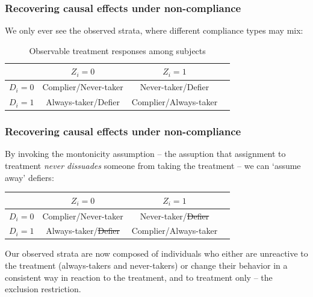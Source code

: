 \documentclass[12pt,english,dvipsnames,aspectratio=169,handout]{beamer}\usepackage[]{graphicx}\usepackage[]{xcolor}
\begin{document}
\begin{frame}
\frametitle{Recovering causal effects under non-compliance}
\footnotesize
We only ever see the observed strata, where different compliance types may mix:

\begin{table}[htbp]\centering\footnotesize
\begin{tabular}{cccc}
\hline
        &         $Z_i=0$         & $Z_i=1$ \\ 
\hline
$D_i=0$ & Complier/Never-taker  & Never-taker/Defier \\
$D_i=1$ & Always-taker/Defier   & Complier/Always-taker  \\
\hline
\end{tabular}
\caption{\scriptsize Observable treatment responses among subjects}
\end{table}
\end{frame}



\begin{frame}
\frametitle{Recovering causal effects under non-compliance}
\footnotesize
By invoking the montonicity assumption -- the assuption that assignment to treatment \emph{never dissuades} someone from taking the treatment -- we can `assume away' defiers:

\begin{table}[htbp]\centering\footnotesize
\begin{tabular}{cccc}
\hline
        &         $Z_i=0$         & $Z_i=1$ \\ 
\hline
$D_i=0$ & Complier/Never-taker  & Never-taker/\sout{Defier} \\
$D_i=1$ & Always-taker/\sout{Defier}   & Complier/Always-taker  \\
\hline
\end{tabular}
\end{table}

Our observed strata are now composed of individuals who either are unreactive to the treatment (always-takers and never-takers) or change their behavior in a consistent way in reaction to the treatment, and to treatment only -- the exclusion restriction. 
\end{frame}
\end{document}
